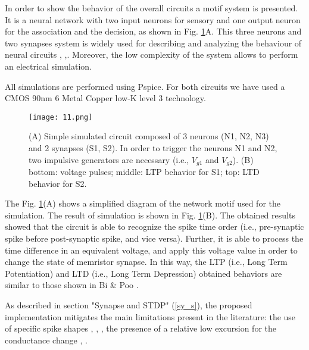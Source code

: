\documentclass[review]{elsarticle}
\begin{document}
In order to show the behavior of the overall circuits a motif system is presented. It is a neural network with two input neurons for sensory and one output neuron for the association and the decision, as shown in Fig. \ref{ExCir}A. This three neurons and two synapses system is widely used for describing and analyzing the behaviour of neural circuits \cite{Wu2015}, \cite{pershin2010},\cite{WuACMOS}. Moreover, the low complexity of the system allows to perform an electrical simulation. 


All simulations are performed using Pspice.
For both circuits we have used a CMOS 90nm 6 Metal Copper low-K level 3 technology.

\begin{figure}[!htbp]
\centering
\texttt{[image: 11.png]}
\caption{(A) Simple simulated circuit composed of 3 neurons (N1, N2, N3) and 2 synapses (S1, S2). In order to trigger the neurons N1 and N2, two impulsive generators are necessary (i.e., $V_{g1}$ and $V_{g2}$). (B) bottom: voltage pulses; middle: LTP behavior for S1; top: LTD behavior for S2.}
\label{ExCir}
\end{figure}

The Fig. \ref{ExCir}(A) shows a simplified diagram of the network motif used for the simulation. The result of simulation is shown in Fig. \ref{ExCir}(B). The obtained results showed that the circuit is able to recognize the spike time order (i.e., pre-synaptic spike before post-synaptic spike, and vice versa). Further, it is able to process the time difference in an equivalent voltage, and apply this voltage value in order to change the state of memristor synapse. In this way, the LTP (i.e., Long Term Potentiation) and LTD (i.e., Long Term Depression) obtained behaviors are similar to those shown in Bi \& Poo \cite{Bi1998}.


As described in section "Synapse and STDP" (\ref{sy_s}), the proposed implementation mitigates the main limitations present in the literature:
the use of specific spike shapes \cite{ZamarrenoRamos2011}, \cite{Wu2015}, \cite{Serrano2012}, the presence of a relative low excursion for the conductance change \cite{ZamarrenoRamos2011}, \cite{XWu2015}.
\end{document}
